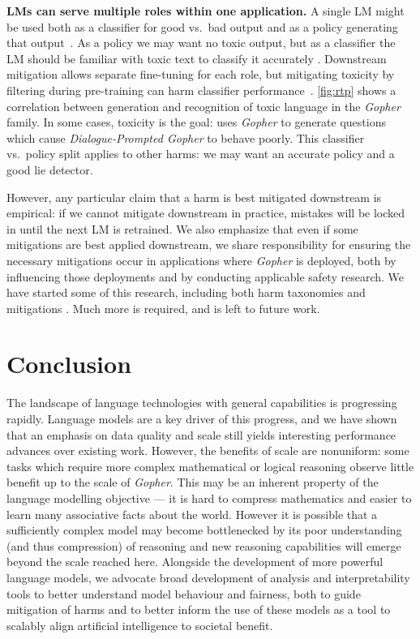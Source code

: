 \documentclass[11pt, a4paper, logo, internal, copyright, nonumbering]{deepmind}
\newcommand{\gopher}{\textit{Gopher}\xspace}
\newcommand{\gopherchat}{\textit{Dialogue-Prompted Gopher}\xspace}
\begin{document}
\textbf{LMs can serve multiple roles within one application.} A single LM might be used both as a classifier for good vs.\ bad output and as a policy generating that output~\citep{stiennon2020learning}.  As a policy we may want no toxic output, but as a classifier the LM should be familiar with toxic text to classify it accurately \citep{buckman2021problematic}.  Downstream mitigation allows separate fine-tuning for each role, but mitigating toxicity by filtering during pre-training can harm classifier performance~\citep{welbl2021challenges}. \autoref{fig:rtp} shows a correlation between generation and recognition of toxic language in the \gopher family. In some cases, toxicity is the goal: \citet{perez2021redteaming} uses \gopher to generate questions which cause \gopherchat to behave poorly.  This classifier vs.\ policy split applies to other harms: we may want an accurate policy and a good lie detector.
    
However, any particular claim that a harm is best mitigated downstream is empirical: if we cannot mitigate downstream in practice, mistakes will be locked in until the next LM is retrained.  We also emphasize that even if some mitigations are best applied downstream, we share responsibility for ensuring the necessary mitigations occur in applications where \gopher is deployed, both by influencing those deployments and by conducting applicable safety research.
We have started some of this research, including both harm taxonomies \citep{weidinger2021harms,kenton2021alignment} and mitigations \citep{welbl2021challenges,perez2021redteaming}.  Much more is required, and is left to future work. 


\section{Conclusion}
The landscape of language technologies with general capabilities is progressing rapidly.  Language models are a key driver of this progress, and we have shown that an emphasis on data quality and scale still yields interesting performance advances over existing work.  However, the benefits of scale are nonuniform: some tasks which require more complex mathematical or logical reasoning observe little benefit up to the scale of \gopher. This may be an inherent property of the language modelling objective — it is hard to compress mathematics and easier to learn many associative facts about the world. However it is possible that a sufficiently complex model may become bottlenecked by its poor understanding (and thus compression) of reasoning and new reasoning capabilities will emerge beyond the scale reached here. Alongside the development of more powerful language models, we advocate broad development of analysis and interpretability tools to better understand model behaviour and fairness, both to guide mitigation of harms and to better inform the use of these models as a tool to scalably align artificial intelligence to societal benefit.
\end{document}

